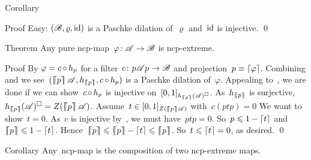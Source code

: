 \begin{parsec}
\begin{point}{Corollary}
\begin{point}{Proof}
Easy: $(\mathscr{B}, \varrho, \operatorname{id})$ is a Paschke dilation of~$\varrho$
and~$\operatorname{id}$ is injective.  \qed
\end{point}
\end{point}
\begin{point}{Theorem}%
Any pure ncp-map~$\varphi\colon \mathscr{A} \to \mathscr{B}$ is ncp-extreme.
\begin{point}{Proof}%
By  $\varphi = c \mathop{\circ} h_p$
    for a filter~$c\colon p\mathscr{A} p \to \mathscr{B}$
    and projection~$p \equiv \left\lceil\varphi\right\rceil$.
    Combining  and 
    we see~$(\cceil{p}\scrA, h_{\cceil{p}}, c\after h_p)$
    is a Paschke dilation of~$\varphi$.
Appealing to~,
    we are done if we can show~$c \mathop{\circ} h_p$
    is injective on~$[0,1]_{h_{\left\lceil\!\!\left\lceil p\right\rceil\!\!\right\rceil}(\mathscr{A})^\square}$.
As~$h_{\left\lceil\!\!\left\lceil p\right\rceil\!\!\right\rceil}$ is surjective,
    $h_{\cceil{p}}(\scrA)^\square = Z(\cceil{p} \scrA)$.
    Assume~$t \in [0,1]_{Z(\left\lceil\!\!\left\lceil p\right\rceil\!\!\right\rceil \mathscr{A})}$ with~$c(ptp)=0$
We want to show~$t = 0$.
As~$c$ is injective by~,
        we must have~$ptp = 0$.
So~$p \leqslant 1- \left\lceil t\right\rceil$
and~$\left\lceil\!\!\left\lceil p\right\rceil\!\!\right\rceil \leqslant 1- \left\lceil t\right\rceil$.
Hence~$\cceil{p} \leq \cceil{p} - \ceil{t} \leq \cceil{p}$.
So~$t \leqslant \left\lceil t \right\rceil=0$, as desired. \qed
\end{point}
\end{point}
\begin{point}{Corollary}%
    Any~ncp-map is the composition of two ncp-extreme maps.
\end{point}
\end{parsec}


